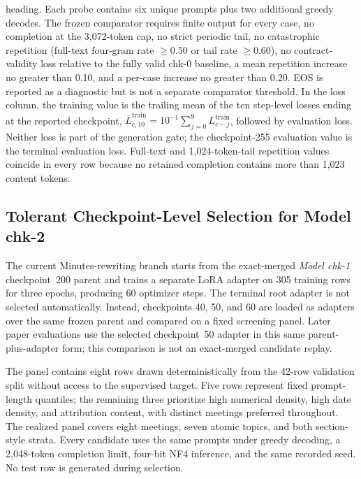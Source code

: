 \begin{table}[htbp]
\begin{minipage}{0.97\textwidth}
        heading. Each probe contains six unique prompts plus two additional
        greedy decodes. The
        frozen comparator requires finite
        output for every case, no completion at the 3,072-token cap, no strict
        periodic tail, no catastrophic repetition (full-text four-gram rate
        $\geq 0.50$ or tail rate $\geq 0.60$), no contract-validity loss relative
        to the fully valid chk-0 baseline, a mean repetition increase no greater
        than 0.10, and a per-case increase no greater than 0.20. EOS is reported
        as a diagnostic but is not a separate comparator threshold. In the loss
        column, the training value is the trailing mean of the ten step-level
        losses ending at the reported checkpoint,
        $\overline{L}^{\mathrm{train}}_{c,10}=10^{-1}\sum_{j=0}^{9}
        L^{\mathrm{train}}_{c-j}$, followed by evaluation loss. Neither loss is
        part of the generation gate; the checkpoint-255 evaluation value is the
        terminal evaluation loss. Full-text and 1,024-token-tail repetition
        values coincide in every row because no retained completion contains
        more than 1,023 content tokens.
    \end{minipage}
    \caption{Post-cp200 generation-stability hard-gate comparison for
    \textit{Model chk-1}. All evaluated checkpoints pass the frozen gate, so
    the table does not establish checkpoint 200 as uniquely stable. Its
    retention remains supported by the minimum logged evaluation loss together
    with a passing contemporaneous generation probe.}
    \label{tab:app:chk1_post_cp200_hard_gates}
\end{table}

\subsection*{Tolerant Checkpoint-Level Selection for Model chk-2}

The current Minutes-rewriting branch starts from the exact-merged
\textit{Model chk-1} checkpoint~200 parent and trains a separate LoRA adapter on
305 training rows for three epochs, producing 60 optimizer steps. The terminal
root adapter is not selected automatically. Instead, checkpoints 40, 50, and
60 are loaded as adapters over the same frozen parent and compared on a fixed
screening panel. Later paper evaluations use the selected checkpoint~50 adapter
in this same parent-plus-adapter form; this comparison is not an exact-merged
candidate replay.

The panel contains eight rows drawn deterministically from the 42-row
validation split without access to the supervised target. Five rows represent
fixed prompt-length quantiles; the remaining three prioritize high numerical
density, high date density, and attribution content, with distinct meetings
preferred throughout. The realized panel covers eight meetings, seven atomic
topics, and both section-style strata. Every candidate uses the same prompts
under greedy decoding, a 2,048-token completion limit, four-bit NF4 inference,
and the same recorded seed. No test row is generated during selection.

